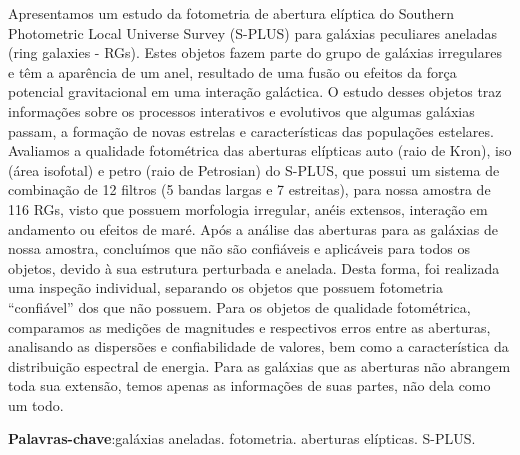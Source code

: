 \setlength{\absparsep}{18pt} %
\begin{resumo}
 
Apresentamos um estudo da fotometria de abertura elíptica do Southern Photometric Local Universe Survey (S-PLUS) para galáxias peculiares aneladas (ring galaxies - RGs). Estes objetos fazem parte do grupo de galáxias irregulares e têm a aparência de um anel, resultado de uma fusão ou efeitos da força potencial gravitacional em uma interação galáctica. O estudo desses objetos traz informações sobre os processos interativos e evolutivos que algumas galáxias passam, a formação de novas estrelas e características das populações estelares. Avaliamos a qualidade fotométrica das aberturas elípticas auto (raio de Kron), iso (área isofotal) e petro (raio de Petrosian) do S-PLUS, que possui um sistema de combinação de 12 filtros (5 bandas largas e 7 estreitas), para nossa amostra de 116 RGs, visto que possuem morfologia irregular, anéis extensos, interação em andamento ou efeitos de maré. Após a análise das aberturas para as galáxias de nossa amostra, concluímos que não são confiáveis e aplicáveis para todos os objetos, devido à sua estrutura perturbada e anelada. Desta forma, foi realizada uma inspeção individual, separando os objetos que possuem fotometria ``confiável'' dos que não possuem. Para os objetos de qualidade fotométrica, comparamos as medições de magnitudes e respectivos erros entre as aberturas, analisando as dispersões e confiabilidade de valores, bem como a característica da distribuição espectral de energia. Para as galáxias que as aberturas não abrangem toda sua extensão, temos apenas as informações de suas partes, não dela como um todo.

 \textbf{Palavras-chave}:galáxias aneladas. fotometria. aberturas elípticas. S-PLUS.
\end{resumo}